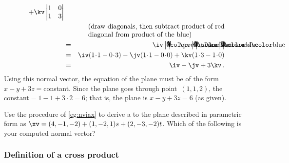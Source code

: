 \begin{example}
\begin{solution}
\begin{eqnarray*}
+\kv\begin{vmatrix} 1&0\\1&3 \end{vmatrix}
\\&&\parbox{20em}{(draw diagonals, then subtract product of red diagonal from product of the blue)}
\\&=&\iv\ab1301
-\jv\ab1001
+\kv\ab1013
\\&=&\iv(1\cdot1-0\cdot3)
-\jv(1\cdot1-0\cdot0)
+\kv(1\cdot3-1\cdot0)
\\&=&\iv-\jv+3\kv\,.
\end{eqnarray*}
Using this normal vector, the equation of the plane must be of the form \(x-y+3z={}\)constant.
Since the plane goes through point~\((1,1,2)\), the constant\({}=1-1+3\cdot2=6\); that is, the plane is \(x-y+3z=6\) (as given).
\end{solution}
\end{example}




\begin{activity} \label{ex:} 
Use the procedure of \autoref{eg:nviax} to derive a  to the plane described in parametric form as \(\xv=(4,-1,-2)+(1,-2,1)s+(2,-3,-2)t\).  
Which of the following is your computed normal vector?
\end{activity}




\subsubsection{Definition of a cross product}

